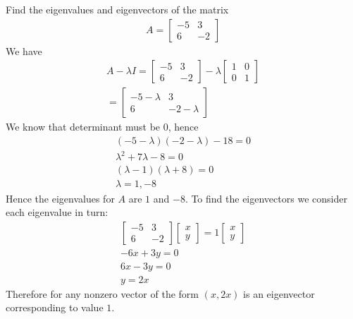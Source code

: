 \documentclass[a4paper]{article}
\theoremstyle{plain}
\theoremstyle{definition}
\newtheorem{exmp}{Example}[section]
\theoremstyle{remark}
\begin{document}
\begin{tcolorbox}[colback=black!3!white,colframe=black!60!white,title=\begin{exmp}Example 1 \label{Example 1}\end{exmp}]
        Find the eigenvalues and eigenvectors of the matrix 
	\begin{align*}
		A = \begin{bmatrix} -5 & 3 \\ 6 & -2 \end{bmatrix} 
	\end{align*}
	We have 
	\begin{align*}
		A - \lambda I = \begin{bmatrix} -5 & 3 \\ 6 & -2 \end{bmatrix} - \lambda \begin{bmatrix} 1 & 0 \\ 0 & 1 \end{bmatrix}  \\
		= \begin{bmatrix} -5 - \lambda & 3 \\ 6 & -2 - \lambda \end{bmatrix} 
	\end{align*}
	We know that determinant must be $0$, hence
	\begin{align*}
		(-5-\lambda)(-2-\lambda)-18 = 0 \\
		\lambda^2 + 7 \lambda - 8 = 0 \\
		(\lambda-1)(\lambda+8) = 0 \\
		\lambda = 1,-8
	\end{align*}
	Hence the eigenvalues for $A$ are $1 $ and $-8$. To find the eigenvectors we consider each eigenvalue in turn:
	\begin{align*}
		\begin{bmatrix} -5 & 3 \\ 6 & -2 \end{bmatrix} \begin{bmatrix} x \\y \end{bmatrix}  = 1 \begin{bmatrix} x \\ y \end{bmatrix} \\
		-6x+3y=0 \\
		6x-3y = 0 \\
		y = 2x
	\end{align*}
	Therefore for any nonzero vector of the form $(x,2x)$ is an eigenvector corresponding to value $1$.

\end{tcolorbox}
\end{document}
